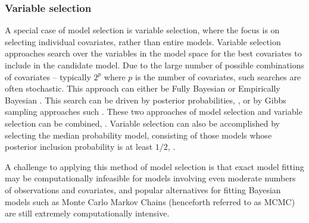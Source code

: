 \subsubsection{Variable selection}
A special case of model selection is variable selection, where the focus is on selecting individual
covariates, rather than entire models. Variable selection approaches search over the
variables in the model space for the best covariates to include in the candidate model. Due to the large
number of possible combinations of covariates -- typically $2^p$ where $p$ is the number of covariates, such
searches are often stochastic. This approach can either be Fully Bayesian or Empirically Bayesian 
\citep{Cui2008}.  This search can be driven by posterior probabilities,  \cite{Casella2006}, or by Gibbs
sampling approaches such  \cite{George1993}. These two approaches of model selection and variable
selection can be combined,  \cite{Geweke1996}. Variable selection can also be accomplished by selecting
the median probability model, consisting of those models whose posterior inclusion probability is at least
$1/2$,  \cite{Barbieri2004}.

A challenge to applying this method of model selection is that exact model fitting may be computationally
infeasible for models involving even moderate numbers of observations and covariates, and popular alternatives
for fitting Bayesian models such as Monte Carlo Markov Chains (henceforth referred to as MCMC) are still
extremely computationally intensive.






